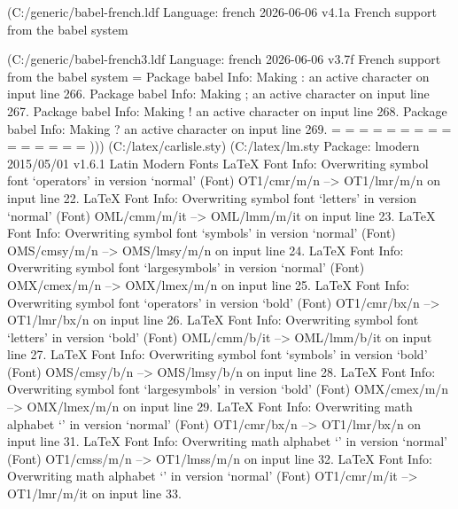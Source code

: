 (C:\MikTeX\tex/generic/babel-french\french.ldf
Language: french 2026-06-06 v4.1a French support from the babel system

(C:\MikTeX\tex/generic/babel-french\french3.ldf
Language: french 2026-06-06 v3.7f French support from the babel system
\FB@stdchar=
Package babel Info: Making : an active character on input line 266.
Package babel Info: Making ; an active character on input line 267.
Package babel Info: Making ! an active character on input line 268.
Package babel Info: Making ? an active character on input line 269.
\FBguill@level=
\FBold@everypar=
\FB@Mht=
\mc@charclass=
\mc@charfam=
\mc@charslot=
\std@mcc=
\dec@mcc=
\listindentFB=
\descindentFB=
=
=
\FB@pardim=
=
\FBfnindent=
)))
(C:\MikTeX\tex/latex/carlisle\scalefnt.sty) (C:\MikTeX\tex/latex/lm\lmodern.sty
Package: lmodern 2015/05/01 v1.6.1 Latin Modern Fonts
LaTeX Font Info:    Overwriting symbol font `operators' in version `normal'
(Font)                  OT1/cmr/m/n --> OT1/lmr/m/n on input line 22.
LaTeX Font Info:    Overwriting symbol font `letters' in version `normal'
(Font)                  OML/cmm/m/it --> OML/lmm/m/it on input line 23.
LaTeX Font Info:    Overwriting symbol font `symbols' in version `normal'
(Font)                  OMS/cmsy/m/n --> OMS/lmsy/m/n on input line 24.
LaTeX Font Info:    Overwriting symbol font `largesymbols' in version `normal'
(Font)                  OMX/cmex/m/n --> OMX/lmex/m/n on input line 25.
LaTeX Font Info:    Overwriting symbol font `operators' in version `bold'
(Font)                  OT1/cmr/bx/n --> OT1/lmr/bx/n on input line 26.
LaTeX Font Info:    Overwriting symbol font `letters' in version `bold'
(Font)                  OML/cmm/b/it --> OML/lmm/b/it on input line 27.
LaTeX Font Info:    Overwriting symbol font `symbols' in version `bold'
(Font)                  OMS/cmsy/b/n --> OMS/lmsy/b/n on input line 28.
LaTeX Font Info:    Overwriting symbol font `largesymbols' in version `bold'
(Font)                  OMX/cmex/m/n --> OMX/lmex/m/n on input line 29.
LaTeX Font Info:    Overwriting math alphabet `\mathbf' in version `normal'
(Font)                  OT1/cmr/bx/n --> OT1/lmr/bx/n on input line 31.
LaTeX Font Info:    Overwriting math alphabet `\mathsf' in version `normal'
(Font)                  OT1/cmss/m/n --> OT1/lmss/m/n on input line 32.
LaTeX Font Info:    Overwriting math alphabet `\mathit' in version `normal'
(Font)                  OT1/cmr/m/it --> OT1/lmr/m/it on input line 33.
